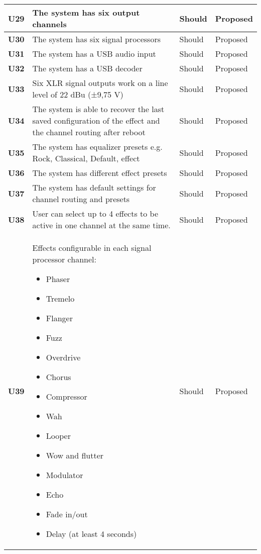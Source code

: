 \begin{longtable}{|l|p{10cm}|l|l|}
	\textbf{U29} &The system has six output channels 													& Should & Proposed\\ \hline
	\textbf{U30} &The system has six signal processors 													& Should & Proposed\\ \hline
	\textbf{U31} &The system has a USB audio input					 									& Should & Proposed\\ \hline
	\textbf{U32} &The system has a USB decoder					 									& Should & Proposed\\ \hline
	\textbf{U33} &Six XLR signal outputs work on a line level of 22 dBu (±9,75 V) 								& Should & Proposed\\ \hline
	\textbf{U34} &The system is able to recover the last saved configuration of the effect and the channel routing after reboot	& Should & Proposed\\ \hline
	\textbf{U35} &The system has equalizer presets e.g. Rock, Classical, Default, effect		 					& Should & Proposed\\ \hline
	\textbf{U36} &The system has different effect presets										 			& Should & Proposed\\ \hline
	\textbf{U37} &The system has default settings for channel routing and presets							 		& Should & Proposed\\ \hline
	\textbf{U38} &User can select up to 4 effects to be active in one channel at the same time. 						& Should & Proposed\\ \hline
	\textbf{U39} &Effects configurable in each signal processor channel:\newline
	\begin{itemize}
		\setlength\itemsep{-0.3em}
		\item Phaser
		\item Tremelo
		\item Flanger
		\item Fuzz
		\item Overdrive
		\item Chorus
		\item Compressor
		\item Wah
		\item Looper
		\item Wow and flutter
		\item Modulator
		\item Echo
		\item Fade in/out
		\item Delay (at least 4 seconds)
	\end{itemize}																			& Should & Proposed\\ \hline

\end{longtable}
